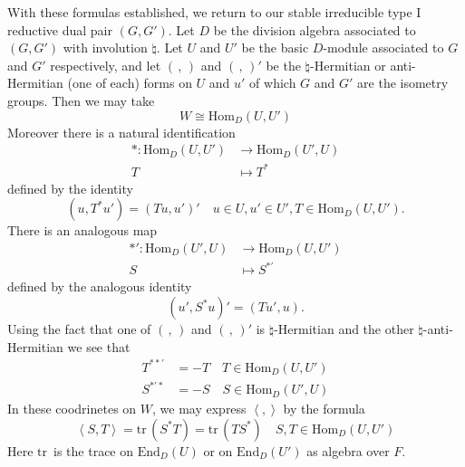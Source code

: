 \documentclass[12pt]{amsart}
\def\inn#1#2{\left\langle{#1},{#2}\right\rangle}
\def\Hom{{\mathrm{Hom}}}
\def\End{{\mathrm{End}}}
\def\inv{{\natural}}
\def\tr{{\mathrm{tr\,}}}
\begin{document}
With these formulas established, we return to our stable irreducible type I
reductive dual pair $(G,G')$. Let $D$ be the division algebra
associated to $(G,G')$ with involution $\inv$. Let $U$ and $U'$
be the basic $D$-module associated to $G$ and $G'$ respectively, 
and let $(\,,\,)$ and $(\,,\,)'$ be the $\inv$-Hermitian or
anti-Hermitian (one of each) forms on $U$ and $u'$ of 
which $G$ and $G'$ are the isometry groups. Then we may take
\begin{equation}\label{eq:20}
W\cong \Hom_D(U,U')
\end{equation}
Moreover there is a natural identification
\[
\begin{split}
* \colon \Hom_D(U,U') &\to \Hom_D(U',U)\\
T&\mapsto T^*
\end{split}
\]
defined by the identity
\begin{equation}\label{eq:21a}
(u,T^*u') = (Tu,u')' \quad u\in U, u'\in U', T\in \Hom_D(U,U').
\end{equation}
There is an analogous map 
\[
\begin{split}
*' \colon \Hom_D(U',U) &\to \Hom_D(U,U')\\
S&\mapsto S^{*'}
\end{split}
\]
defined by the analogous identity
\begin{equation}\label{eq:21b}
(u',S^*u)' = (Tu',u).
\end{equation}
Using the fact that one of $(\,,\,)$ and $(\,,\,)'$ is $\inv$-Hermitian and
the other $\inv$-anti-Hermitian we see that 
\begin{equation}
\begin{split}
T^{**'} &= -T \quad T\in \Hom_D(U,U')\\
S^{*'*} &= -S \quad S\in \Hom_D(U',U)
\end{split}
\end{equation}
In these coodrinetes on $W$, we may express $\inn{}{}$ by the formula 
\begin{equation}\label{eq:23}
\inn{S}{T} = \tr(S^*T) = \tr(TS^*)\quad S,T\in \Hom_D(U,U')
\end{equation}
Here $\tr$ is the trace on $\End_D(U)$ or on $\End_D(U')$ as algebra over $F$.
\end{document}
